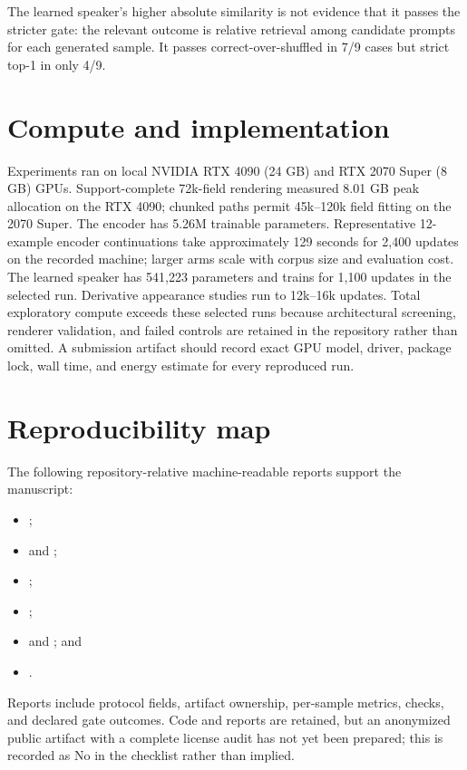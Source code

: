 \documentclass{article}
\begin{document}
The learned speaker's higher absolute similarity is not evidence that it passes the stricter gate:
the relevant outcome is relative retrieval among candidate prompts for each generated sample. It
passes correct-over-shuffled in 7/9 cases but strict top-1 in only 4/9.

\section{Compute and implementation}
\label{app:compute}

Experiments ran on local NVIDIA RTX 4090 (24 GB) and RTX 2070 Super (8 GB) GPUs. Support-complete
72k-field rendering measured 8.01 GB peak allocation on the RTX 4090; chunked paths permit 45k--120k
field fitting on the 2070 Super. The encoder has 5.26M trainable parameters. Representative
12-example encoder continuations take approximately 129 seconds for 2,400 updates on the recorded
machine; larger arms scale with corpus size and evaluation cost. The learned speaker has 541,223
parameters and trains for 1,100 updates in the selected run. Derivative appearance studies run to
12k--16k updates. Total exploratory compute exceeds these selected runs because architectural
screening, renderer validation, and failed controls are retained in the repository rather than
omitted. A submission artifact should record exact GPU model, driver, package lock, wall time, and
energy estimate for every reproduced run.

\section{Reproducibility map}
\label{app:repro}

The following repository-relative machine-readable reports support the manuscript:
\begin{itemize}
  \item {};
  \item {} and
    ;
  \item {};
  \item {};
  \item {} and
    ; and
  \item {}.
\end{itemize}
Reports include protocol fields, artifact ownership, per-sample metrics, checks, and declared gate
outcomes. Code and reports are retained, but an anonymized public artifact with a complete license
audit has not yet been prepared; this is recorded as No in the checklist rather than implied.


\end{document}
